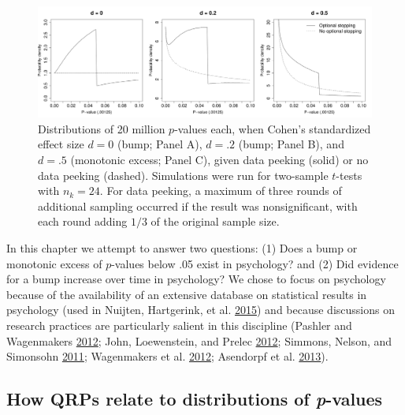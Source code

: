 \documentclass[a5paper]{book}
\begin{document}
\begin{figure}

{\centering \includegraphics[width=1\linewidth]{assets/figures/bump-fig1.pdf.svg} 

}

\caption{Distributions of 20 million $p$-values each, when Cohen's standardized effect size $d=0$ (bump; Panel A), $d=.2$ (bump; Panel B), and $d=.5$ (monotonic excess; Panel C), given data peeking (solid) or no data peeking (dashed). Simulations were run for two-sample $t$-tests with $n_k=24$. For data peeking, a maximum of three rounds of additional sampling occurred if the result was nonsignificant, with each round adding $1/3$ of the original sample size.}\label{fig:bump-fig1}
\end{figure}

In this chapter we attempt to answer two questions: (1) Does a bump or
monotonic excess of \(p\)-values below .05 exist in psychology? and (2)
Did evidence for a bump increase over time in psychology? We chose to
focus on psychology because of the availability of an extensive database
on statistical results in psychology (used in Nuijten, Hartgerink, et
al. \protect\hyperlink{ref-doi:10.3758ux2fs13428-015-0664-2}{2015}) and
because discussions on research practices are particularly salient in
this discipline (Pashler and Wagenmakers
\protect\hyperlink{ref-doi:10.1177ux2f1745691612465253}{2012}; John,
Loewenstein, and Prelec
\protect\hyperlink{ref-doi:10.1177ux2f0956797611430953}{2012}; Simmons,
Nelson, and Simonsohn
\protect\hyperlink{ref-doi:10.1177ux2f0956797611417632}{2011};
Wagenmakers et al.
\protect\hyperlink{ref-doi:10.1177ux2f1745691612463078}{2012}; Asendorpf
et al. \protect\hyperlink{ref-doi:10.1002ux2fper.1919}{2013}).

\subsection{\texorpdfstring{How QRPs relate to distributions of
\emph{p}-values}{How QRPs relate to distributions of p-values}}\label{how-qrps-relate-to-distributions-of-p-values}
\end{document}
